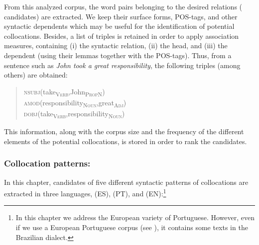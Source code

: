 \documentclass[output=paper
,modfonts
,nonflat]{langsci/langscibook}
\begin{document}
From this analyzed corpus, the word pairs belonging to the desired relations
( candidates) are extracted. We keep their surface forms, POS-tags,
and other syntactic dependents which may be useful for the identification
of potential collocations. Besides, a list of triples is retained in order to apply association measures,
containing (i) the syntactic relation, (ii) the head, and (iii) the dependent (using their lemmas
together with the POS-tags). Thus, from a sentence such as \emph{John took a great responsibility},
the following triples (among others) are obtained:

\begin{quotation}
  \noindent\textsc{nsubj}(take\textsubscript{\textsc{Verb}},John\textsubscript{\textsc{PropN}})\\
  \textsc{amod}(responsibility\textsubscript{\textsc{Noun}},great\textsubscript{\textsc{Adj}})\\
  \textsc{dobj}(take\textsubscript{\textsc{Verb}},responsibility\textsubscript{\textsc{Noun}})
\end{quotation}

This information, along with the corpus size and the frequency of the different elements
of the potential collocations, is stored in order to rank the candidates.

\subsubsection{Collocation patterns:} In this chapter, candidates of five different syntactic
patterns of collocations are extracted in three languages,  (ES),  (PT), and  (EN):\footnote{In this chapter we address the European variety of Portuguese.
  However, even if we use a European Portuguese corpus (see ),
  it contains some texts in the Brazilian dialect.}
\end{document}
